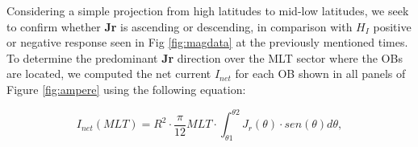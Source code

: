 \documentclass[a4paper]{article}
\theoremstyle{plain}
\theoremstyle{definition}
\begin{document}
	Considering a simple projection from high latitudes to mid-low latitudes, we seek to confirm whether \textbf{Jr} is ascending or descending, in comparison with $H_I$ positive or negative response seen in Fig \ref{fig:magdata} at the previously mentioned times. To determine the predominant \textbf{Jr} direction over the MLT sector where the OBs are located, we computed the net current $I_{net}$ \citep{Inet_ampere} for each OB shown in all panels of Figure \ref{fig:ampere} using the following equation:
	
	
	
	
	
	
	
	\begin{equation}
		\label{eq:Inet}
		I_{net}(MLT) = R^2 \cdot \frac{\pi}{12} MLT \cdot \int_{\theta1}^{\theta2} J_r(\theta) \cdot sen(\theta) d\theta,
	\end{equation}
\end{document}
